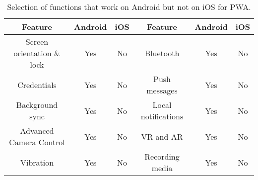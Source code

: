 \begin{table}[ht]
    \centering
    \begin{tabular}{ |c|c|c|c|c|c| } 
        \hline
        \rowcolor{light-gray}
        Feature & Android & iOS & Feature & Android & iOS\\
        \hline
        Screen orientation \& lock & Yes & No & Bluetooth & Yes & No \\ 
        \hline
        Credentials & Yes & No & Push messages & Yes & No \\ 
        \hline
        Background sync & Yes & No & Local notifications & Yes & No \\ 
        \hline
        Advanced Camera Control & Yes & No & VR and AR & Yes & No \\
        \hline
        Vibration & Yes & No & Recording media & Yes & No\\
        \hline
    \end{tabular}
    \caption{\label{tab:yes-no-features}Selection of functions that work on Android but not on iOS for PWA.}
\end{table}